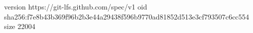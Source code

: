 version https://git-lfs.github.com/spec/v1
oid sha256:f7e8b43b369f96b2b3e44a29438f596b9770ad81852d513e3cf793507c6cc554
size 22004

